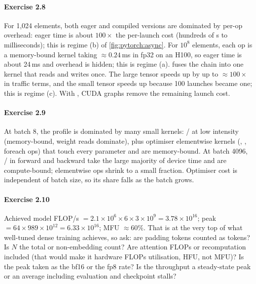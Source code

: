 \paragraph{Exercise 2.8}
For 1{,}024 elements, both eager and compiled versions are dominated by per-op overhead: eager time is about
$100\times$ the per-launch cost (hundreds of \textmu s to milliseconds); this is regime (b) of
\cref{fig:pytorch:async}. For $10^8$ elements, each op is a memory-bound kernel taking $\approx0.24$\,ms in fp32 on an
H100, so eager time is about 24\,ms and overhead is hidden; this is regime (a).  fuses the chain into one
kernel that reads and writes once. The large tensor speeds up by up to $\approx100\times$ in traffic terms, and the small
tensor speeds up because 100 launches became one; this is regime (c). With , CUDA graphs remove
the remaining launch cost.

\paragraph{Exercise 2.9}
At batch 8, the profile is dominated by many small kernels: / at low intensity (memory-bound,
weight reads dominate), plus optimiser elementwise kernels (, , foreach ops) that touch every
parameter and are memory-bound. At batch 4096, / in forward and backward take the large majority of
device time and are compute-bound; elementwise ops shrink to a small fraction. Optimiser cost is independent of batch
size, so its share falls as the batch grows.

\paragraph{Exercise 2.10}
Achieved model FLOP/s $=2.1\times10^6\times6\times3\times10^9=3.78\times10^{16}$; peak $=64\times989\times10^{12}=6.33\times10^{16}$; MFU
$\approx60\%$. That is at the very top of what well-tuned dense training achieves, so ask: are padding tokens counted as
tokens? Is $N$ the total or non-embedding count? Are attention FLOPs or recomputation included (that would make it
hardware FLOPs utilisation, HFU, not MFU)? Is the peak taken as the bf16 or the fp8 rate? Is the throughput a
steady-state peak or an average including evaluation and checkpoint stalls?
